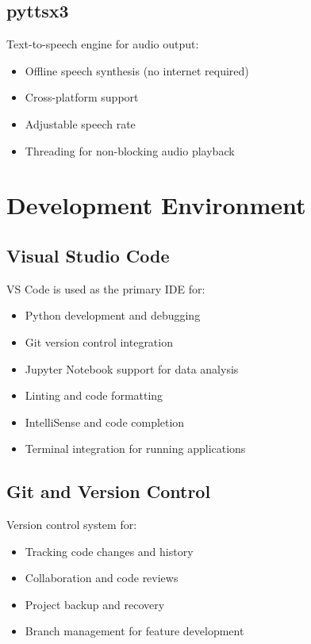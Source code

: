 \subsection{pyttsx3}

Text-to-speech engine for audio output:
\begin{itemize}
    \item Offline speech synthesis (no internet required)
    \item Cross-platform support
    \item Adjustable speech rate
    \item Threading for non-blocking audio playback
\end{itemize}

\section{Development Environment}

\subsection{Visual Studio Code}

VS Code is used as the primary IDE for:
\begin{itemize}
    \item Python development and debugging
    \item Git version control integration
    \item Jupyter Notebook support for data analysis
    \item Linting and code formatting
    \item IntelliSense and code completion
    \item Terminal integration for running applications
\end{itemize}

\subsection{Git and Version Control}

Version control system for:
\begin{itemize}
    \item Tracking code changes and history
    \item Collaboration and code reviews
    \item Project backup and recovery
    \item Branch management for feature development
\end{itemize}

